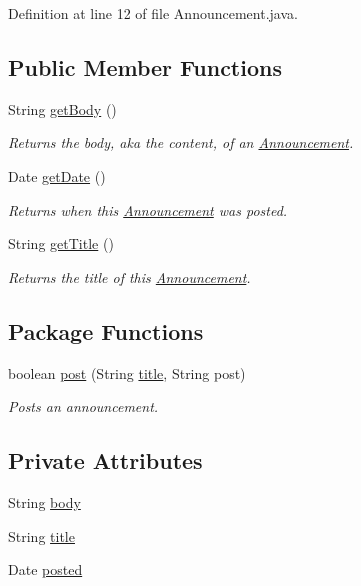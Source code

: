 Definition at line 12 of file Announcement.java.\subsection*{Public Member Functions}
\begin{CompactItemize}
\item 
String \hyperlink{classAnnouncement_af0e521a6b1fc8dacf7bfae6ae742d47}{getBody} ()
\begin{CompactList}\small\item\em Returns the body, aka the content, of an \hyperlink{classAnnouncement}{Announcement}. \item\end{CompactList}\item 
Date \hyperlink{classAnnouncement_171773283804e5dedeaab914c2652379}{getDate} ()
\begin{CompactList}\small\item\em Returns when this \hyperlink{classAnnouncement}{Announcement} was posted. \item\end{CompactList}\item 
String \hyperlink{classAnnouncement_2432e5072742ed1bcd266954088a40b8}{getTitle} ()
\begin{CompactList}\small\item\em Returns the title of this \hyperlink{classAnnouncement}{Announcement}. \item\end{CompactList}\end{CompactItemize}
\subsection*{Package Functions}
\begin{CompactItemize}
\item 
boolean \hyperlink{classAnnouncement_f7a63ab0943725b670109306ae520c34}{post} (String \hyperlink{classAnnouncement_8abcfd285ced4127d22bb1609478adb2}{title}, String post)
\begin{CompactList}\small\item\em Posts an announcement. \item\end{CompactList}\end{CompactItemize}
\subsection*{Private Attributes}
\begin{CompactItemize}
\item 
String \hyperlink{classAnnouncement_7404bc5a9f7dd0652691fba2bcd5f0b0}{body}
\item 
String \hyperlink{classAnnouncement_8abcfd285ced4127d22bb1609478adb2}{title}
\item 
Date \hyperlink{classAnnouncement_2a465f65c7d03a23ccd84278e0a64577}{posted}
\end{CompactItemize}


